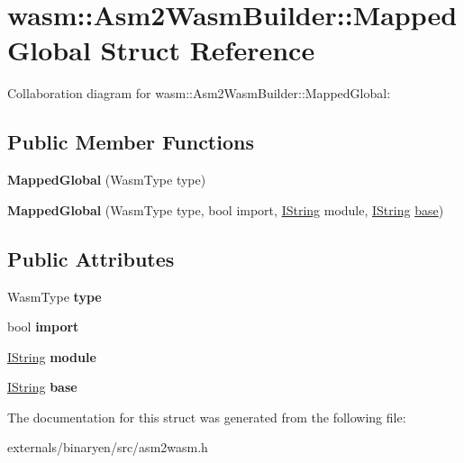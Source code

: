 \hypertarget{structwasm_1_1_asm2_wasm_builder_1_1_mapped_global}{}\section{wasm\+:\+:Asm2\+Wasm\+Builder\+:\+:Mapped\+Global Struct Reference}
\label{structwasm_1_1_asm2_wasm_builder_1_1_mapped_global}


Collaboration diagram for wasm\+:\+:Asm2\+Wasm\+Builder\+:\+:Mapped\+Global\+:
\subsection*{Public Member Functions}
\begin{DoxyCompactItemize}
\item 
\mbox{\label{structwasm_1_1_asm2_wasm_builder_1_1_mapped_global_ae28891c495ce83c1a5d0781634864bab}} 
{\bfseries Mapped\+Global} (Wasm\+Type type)
\item 
\mbox{\label{structwasm_1_1_asm2_wasm_builder_1_1_mapped_global_a5e318dd10e5d64e9ab8aaac2819023ef}} 
{\bfseries Mapped\+Global} (Wasm\+Type type, bool import, \mbox{\hyperlink{structcashew_1_1_i_string}{I\+String}} module, \mbox{\hyperlink{structcashew_1_1_i_string}{I\+String}} \mbox{\hyperlink{structbase}{base}})
\end{DoxyCompactItemize}
\subsection*{Public Attributes}
\begin{DoxyCompactItemize}
\item 
\mbox{\label{structwasm_1_1_asm2_wasm_builder_1_1_mapped_global_a5fb37a477cfa4504974031968fc1b582}} 
Wasm\+Type {\bfseries type}
\item 
\mbox{\label{structwasm_1_1_asm2_wasm_builder_1_1_mapped_global_ac754c3f1a7acfe8cff68de282ea484af}} 
bool {\bfseries import}
\item 
\mbox{\label{structwasm_1_1_asm2_wasm_builder_1_1_mapped_global_a52b81cbe2518d3359fa2bcc25ffebd2e}} 
\mbox{\hyperlink{structcashew_1_1_i_string}{I\+String}} {\bfseries module}
\item 
\mbox{\label{structwasm_1_1_asm2_wasm_builder_1_1_mapped_global_a929a166cc2fcdde19abc4ffcf8ff1261}} 
\mbox{\hyperlink{structcashew_1_1_i_string}{I\+String}} {\bfseries base}
\end{DoxyCompactItemize}


The documentation for this struct was generated from the following file\+:\begin{DoxyCompactItemize}
\item 
externals/binaryen/src/asm2wasm.\+h\end{DoxyCompactItemize}
